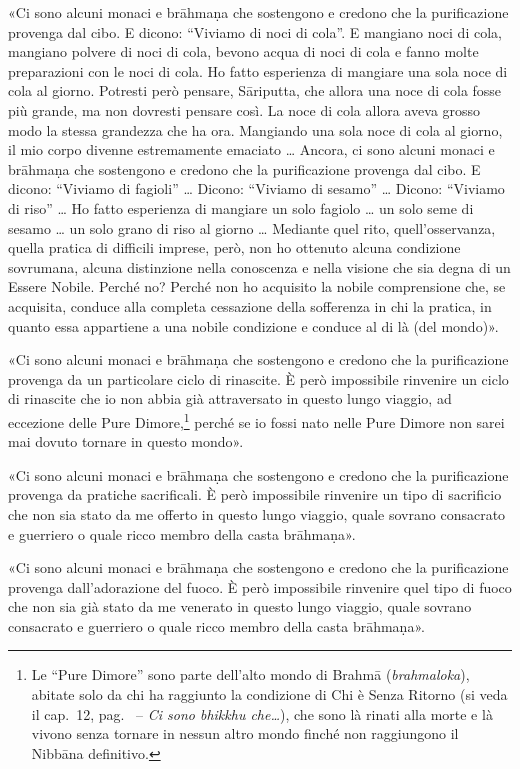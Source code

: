 «Ci sono alcuni monaci e brāhmaṇa che sostengono e credono che la purificazione
provenga dal cibo. E dicono: “Viviamo di noci di cola”. E mangiano noci di cola,
mangiano polvere di noci di cola, bevono acqua di noci di cola e fanno molte
preparazioni con le noci di cola. Ho fatto esperienza di mangiare una sola noce
di cola al giorno. Potresti però pensare, Sāriputta, che allora una noce di cola
fosse più grande, ma non dovresti pensare così. La noce di cola allora aveva
grosso modo la stessa grandezza che ha ora. Mangiando una sola noce di cola al
giorno, il mio corpo divenne estremamente emaciato … Ancora, ci sono alcuni
monaci e brāhmaṇa che sostengono e credono che la purificazione provenga dal
cibo. E dicono: “Viviamo di fagioli” … Dicono: “Viviamo di sesamo” … Dicono:
“Viviamo di riso” … Ho fatto esperienza di mangiare un solo fagiolo … un solo
seme di sesamo … un solo grano di riso al giorno … Mediante quel rito,
quell’osservanza, quella pratica di difficili imprese, però, non ho ottenuto
alcuna condizione sovrumana, alcuna distinzione nella conoscenza e nella visione
che sia degna di un Essere Nobile. Perché no? Perché non ho acquisito la nobile
comprensione che, se acquisita, conduce alla completa cessazione della
sofferenza in chi la pratica, in quanto essa appartiene a una nobile condizione
e conduce al di là (del mondo)».

«Ci sono alcuni monaci e brāhmaṇa che sostengono e credono che la purificazione
provenga da un particolare ciclo di rinascite. È però impossibile rinvenire un
ciclo di rinascite che io non abbia già attraversato in questo lungo viaggio, ad
eccezione delle Pure Dimore,\footnote{%
  Le “Pure Dimore” sono parte dell’alto mondo di Brahmā (\emph{brahmaloka}),
  abitate solo da chi ha raggiunto la condizione di Chi è Senza Ritorno (si veda
  il cap.~12, pag.~\pageref{pag263} -- \emph{Ci sono bhikkhu che\ldots}), che
  sono là rinati alla morte e là vivono senza tornare in nessun altro mondo
  finché non raggiungono il Nibbāna definitivo.}
perché se io fossi nato nelle Pure Dimore non sarei mai dovuto tornare in questo
mondo».

«Ci sono alcuni monaci e brāhmaṇa che sostengono e credono che la purificazione
provenga da pratiche sacrificali. È però impossibile rinvenire un tipo di
sacrificio che non sia stato da me offerto in questo lungo viaggio, quale
sovrano consacrato e guerriero o quale ricco membro della casta brāhmaṇa».

«Ci sono alcuni monaci e brāhmaṇa che sostengono e credono che la purificazione
provenga dall’adorazione del fuoco. È però impossibile rinvenire quel tipo di
fuoco che non sia già stato da me venerato in questo lungo viaggio, quale
sovrano consacrato e guerriero o quale ricco membro della casta brāhmaṇa».

